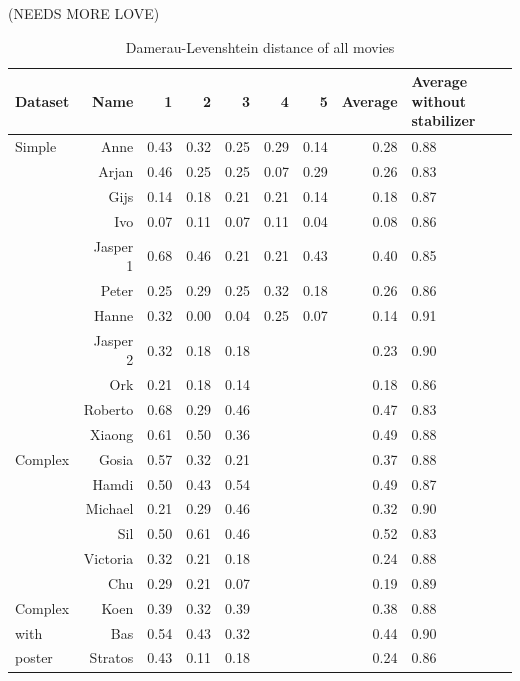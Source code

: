 (NEEDS MORE LOVE)


\begin{table}
\centering
\begin{tabular}{p{0.4in}rrrrrrrp{0.55in}}
\hline
Dataset & Name	& 1 & 2 & 3 & 4 & 5 & Average & Average without stabilizer\\
\hline
Simple & Anne	&	0.43	&	0.32	&	0.25	&	0.29	&	0.14	&	0.28	&	0.88 \\
 & Arjan	&	0.46	&	0.25	&	0.25	&	0.07	&	0.29	&	0.26	&	0.83 \\
 & Gijs	&	0.14	&	0.18	&	0.21	&	0.21	&	0.14	&	0.18	&	0.87 \\
 & Ivo	&	0.07	&	0.11	&	0.07	&	0.11	&	0.04	&	0.08	&	0.86 \\
 & Jasper 1	&	0.68	&	0.46	&	0.21	&	0.21	&	0.43	&	0.40	&	0.85 \\
 & Peter	&	0.25	&	0.29	&	0.25	&	0.32	&	0.18	&	0.26	&	0.86 \\
 & Hanne	&	0.32	&	0.00	&	0.04	&	0.25	&	0.07	&	0.14	&	0.91 \\
 & Jasper 2	&	0.32	&	0.18	&	0.18	&	 	&	 	&	0.23	&	0.90 \\
 & Ork	&	0.21	&	0.18	&	0.14	&	 	&	 	&	0.18	&	0.86 \\
 & Roberto	&	0.68	&	0.29	&	0.46	&	 	&	 	&	0.47	&	0.83 \\
 & Xiaong	&	0.61	&	0.50	&	0.36	&	 	&	 	&	0.49	&	0.88 \\
\hline
Complex & Gosia	&	0.57	&	0.32	&	0.21	&	 	&	 	&	0.37	&	0.88 \\
 & Hamdi	&	0.50	&	0.43	&	0.54	&	 	&	 	&	0.49	&	0.87 \\
 & Michael	&	0.21	&	0.29	&	0.46	&	 	&	 	&	0.32	&	0.90 \\
 & Sil	&	0.50	&	0.61	&	0.46	&	 	&	 	&	0.52	&	0.83 \\
 & Victoria	&	0.32	&	0.21	&	0.18	&	 	&	 	&	0.24	&	0.88 \\
 & Chu	&	0.29	&	0.21	&	0.07	&	 	&	 	&	0.19	&	0.89 \\
\hline
Complex & Koen	&	0.39	&	0.32	&	0.39	&	 	&	 	&	0.38	&	0.88\\
with & Bas	&	0.54	&	0.43	&	0.32	&	 	&	 	&	0.44	&	0.90 \\
poster & Stratos	&	0.43	&	0.11	&	0.18	&	 	&	 	&	0.24	&	0.86 \\


\hline
\end{tabular}
\caption{Damerau-Levenshtein distance of all movies}
\label{tab:distance}
\end{table}



